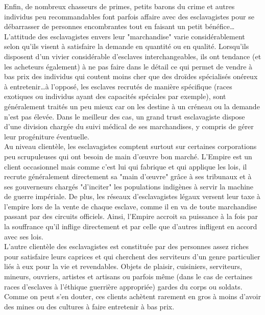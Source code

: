 \documentclass[twoside]{article}
\begin{document}
Enfin, de nombreux chasseurs de primes, petits barons du crime et autres individus peu recommandables font parfois affaire avec des esclavagistes pour se débarrasser de personnes encombrantes tout en faisant un petit bénéfice\ldots\\

L'attitude des esclavagistes envers leur "marchandise" varie considérablement selon qu'ils visent à satisfaire la demande en quantité ou en qualité. Lorsqu'ils disposent d'un vivier considérable d'esclaves interchangeables, ils ont tendance (et les acheteurs également) à ne pas faire dans le détail ce qui permet de vendre à bas prix des individus qui coutent moins cher que des droïdes spécialisés onéreux à entretenir\ldots à l'opposé, les esclaves recrutés de manière spécifique (races exotiques ou individus ayant des capacités spéciales par exemple), sont généralement traités un peu mieux car on les destine à un créneau ou la demande n'est pas élevée. Dans le meilleur des cas, un grand trust esclavagiste dispose d'une division chargée du suivi médical de ses marchandises, y compris de gérer leur progéniture éventuelle.\\

Au niveau clientèle, les esclavagistes comptent surtout sur certaines corporations peu scrupuleuses qui ont besoin de main d'œuvre bon marché. L'Empire est un client occasionnel mais comme c'est lui qui fabrique et qui applique les lois, il recrute généralement directement sa "main d'œuvre" grâce à ses tribunaux et à ses gouverneurs chargés "d'inciter" les populations indigènes à servir la machine de guerre impériale. De plus, les réseaux d'esclavagistes légaux versent leur taxe à l'empire lors de la vente de chaque esclave, comme il en va de toute marchandise passant par des circuits officiels. Ainsi, l'Empire accroit sa puissance à la fois par la souffrance qu'il inflige directement et par celle que d'autres infligent en accord avec ses lois.\\

L'autre clientèle des esclavagistes est constituée par des personnes assez riches pour satisfaire leurs caprices et qui cherchent des serviteurs d'un genre particulier liés à eux pour la vie et revendables. Objets de plaisir, cuisiniers, serviteurs, mineurs, ouvriers, artistes et artisans ou parfois même (dans le cas de certaines races d'esclaves à l'éthique guerrière appropriée) gardes du corps ou soldats. Comme on peut s'en douter, ces clients achètent rarement en gros à moins d'avoir des mines ou des cultures à faire entretenir à bas prix.
\end{document}
